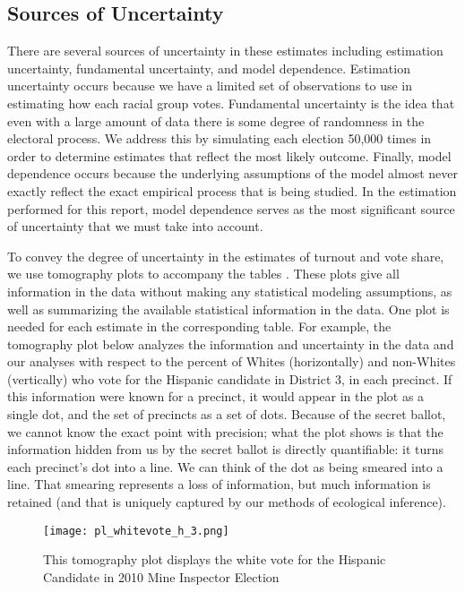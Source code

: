 \documentclass[12pt]{scrartcl}
\begin{document}
\subsection{Sources of Uncertainty}
There are several sources of uncertainty in these estimates including estimation uncertainty, fundamental uncertainty, and model dependence. Estimation uncertainty occurs because we have a limited set of observations to use in estimating how each racial group votes. Fundamental uncertainty is the idea that even with a large amount of data there is some degree of randomness in the electoral process. We address this by simulating each election 50,000 times in order to determine estimates that reflect the most likely outcome. Finally, model dependence occurs because the underlying assumptions of the model almost never exactly reflect the exact empirical process that is being studied. In the estimation performed for this report, model dependence serves as the most significant source of uncertainty that we must take into account. 

To convey the degree of uncertainty in the estimates of turnout and vote share, we use tomography plots to accompany the tables \citep{king1997}.  These plots give all information in the data without making any statistical modeling assumptions, as well as summarizing the available statistical information in the data. One plot is needed for each estimate in the corresponding table. For example, the tomography plot below analyzes the information and uncertainty in the data and our analyses with respect to the percent of Whites (horizontally) and non-Whites (vertically) who vote for the Hispanic candidate in District 3, in each precinct. If this information were known for a precinct, it would appear in the plot as a single dot, and the set of precincts as a set of dots. Because of the secret ballot, we cannot know the exact point with precision; what the plot shows is that the information hidden from us by the secret ballot is directly quantifiable: it turns each precinct's dot into a line.  We can think of the dot as being smeared into a line. That smearing represents a loss of information, but much information is retained (and that is uniquely captured by  our methods of ecological inference).

\begin{figure}[htb]
\begin{centering}
\texttt{[image: pl\_whitevote\_h\_3.png]}
\caption{This tomography plot displays the white vote for the Hispanic Candidate in 2010 Mine Inspector Election}
\end{centering}
\label{tomog}
\end{figure}
\end{document}

